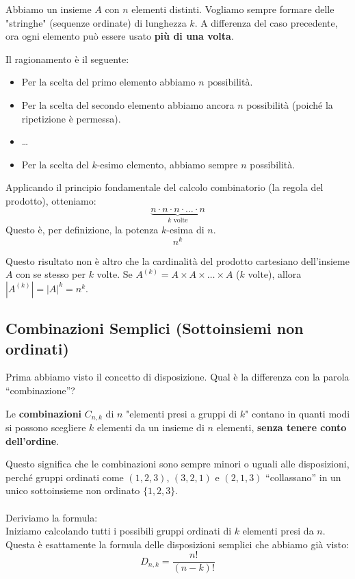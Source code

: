 Abbiamo un insieme $A$ con $n$ elementi distinti. Vogliamo sempre formare delle "stringhe" (sequenze ordinate) di lunghezza $k$.
A differenza del caso precedente, ora ogni elemento può essere usato \textbf{più di una volta}.

Il ragionamento è il seguente:
\begin{itemize}
    \item Per la scelta del primo elemento abbiamo $n$ possibilità.
    \item Per la scelta del secondo elemento abbiamo ancora $n$ possibilità (poiché la ripetizione è permessa).
    \item \dots
    \item Per la scelta del $k$-esimo elemento, abbiamo sempre $n$ possibilità.
\end{itemize}

Applicando il principio fondamentale del calcolo combinatorio (la regola del prodotto), otteniamo:
\[ \underbrace{n \cdot n \cdot n \cdot \dots \cdot n}_{k \text{ volte}} \]
Questo è, per definizione, la potenza $k$-esima di $n$.
\[ n^k \]

\begin{osservazione}
Questo risultato non è altro che la cardinalità del prodotto cartesiano dell'insieme $A$ con se stesso per $k$ volte. Se $A^{(k)} = A \times A \times \dots \times A$ ($k$ volte), allora $|A^{(k)}| = |A|^k = n^k$.
\end{osservazione}


\subsection{Combinazioni Semplici (Sottoinsiemi non ordinati)}

Prima abbiamo visto il concetto di disposizione. Qual è la differenza con la parola ``combinazione''?

Le \textbf{combinazioni} $C_{n,k}$ di $n$ "elementi presi a gruppi di $k$" contano in quanti modi si possono scegliere $k$ elementi da un insieme di $n$ elementi, \textbf{senza tenere conto dell'ordine}. 

Questo significa che le combinazioni sono sempre minori o uguali alle disposizioni, perché gruppi ordinati come $(1,2,3)$, $(3,2,1)$ e $(2,1,3)$ ``collassano'' in un unico sottoinsieme non ordinato $\{1,2,3\}$.
\\\\Deriviamo la formula:
\\Iniziamo calcolando tutti i possibili gruppi ordinati di $k$ elementi presi da $n$. Questa è esattamente la formula delle disposizioni semplici che abbiamo già visto:
\[ D_{n,k} = \frac{n!}{(n-k)!} \]

